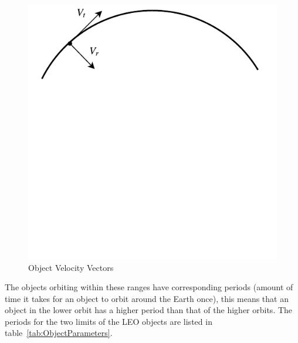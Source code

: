 \documentclass[11pt]{witseiepaper}
\begin{document}
\begin{bibunit}[witseie]
\begin{figure}[htb]
\centering
\includegraphics[width=\linewidth]{Vectors.pdf}
\caption{Object Velocity Vectors}
\label{fig:ObjectVelocityVectors}
\end{figure}




The objects orbiting within these ranges have corresponding periods (amount of time it takes for an object to orbit around the Earth once), this means that an object in the lower orbit has a higher period than that of the higher orbits. The periods for the two limits of the LEO objects are listed in table~\ref{tab:ObjectParameters}.


\end{bibunit}
\end{document}
